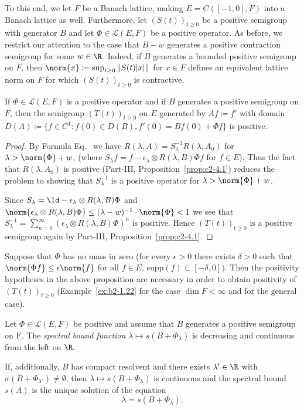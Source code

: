 To this end, we let $F$ be a Banach lattice, making $E = C([-1,0],F)$ into a Banach lattice as well. 
Furthermore, let $(S(t))_{t \geq 0}$ be a positive semigroup with generator $B$ and let $\Phi \in \mathcal{L}(E,F)$ be a positive operator. 
As before, we restrict our attention to the case that $B - w$ generates a positive contraction semigroup for some $w \in \R$. 
Indeed, if\/ $B$ generates a bounded positive semigroup on $F$, then $\norm{x}  \coloneq  \sup_{t \geq 0}\|S(t)|x|\|$ for $x \in F$ defines an equivalent lattice norm on $F$ for which $(S(t))_{t \geq 0}$ is contractive.
\begin{proposition}\label{prop:b4-3.5}
	If\/ $\Phi \in \mathcal{L}(E,F)$ is a positive operator and if\/ $B$ generates a positive semigroup on $F$, then the semigroup $(T(t))_{t \geq 0}$ on $E$ generated by $Af  \coloneq  f'$ with domain $D(A)  \coloneq  \{f \in C^1 \colon f(0) \in D(B), f'(0) = Bf(0) + \Phi f\}$ is positive.
\end{proposition}
\begin{proof} By Formula Eq.~ we have $R(\lambda,A) = S_\lambda^{-1}R(\lambda,A_{0})$ for $\lambda > \norm{\Phi}+w$, (where $S_\lambda f = f - \epsilon_\lambda \otimes R(\lambda,B)\Phi f$ for $f \in E$). 
Thus the fact that $R(\lambda,A_{0})$ is positive (Part-III, Proposition~\ref{prop:c2-4.1}) reduces the problem to showing that $S_\lambda^{-1}$ is a positive operator for $\lambda > \norm{\Phi}+w$.

Since $S_\lambda = \Id  - \epsilon_\lambda \otimes R(\lambda,B)\Phi$ and $\norm{\epsilon_\lambda \otimes R(\lambda,B)\Phi} \leq (\lambda-w)^{-1} \cdot \norm{\Phi} < 1$ we see that $S_\lambda^{-1} = \sum_{n=0}^{\infty}(\epsilon_\lambda \otimes R(\lambda,B)\Phi)^n$ is positive. 
Hence $(T(t))_{t \geq 0}$ is a positive semigroup again by Part-III, Proposition~\ref{prop:c2-4.1}.
\end{proof}
\begin{remark*}
Suppose that $\Phi$ has no mass in zero (\ie  for every $\epsilon > 0$ there exists $\delta > 0$ such that $\norm{\Phi f} \leq \epsilon \norm{f}$ for all $f \in E$, supp$(f) \subset [-\delta,0])$. 
Then the positivity hypotheses in the above proposition are necessary in order to obtain positivity of\/ $(T(t))_{t \geq 0}$ (\cf Example~\ref{ex:b2-1.22} for the case $\dim F < \infty$ and \textcite{kerscher:1986} for the general case).
\end{remark*}
\begin{proposition}\label{prop:b4-3.6}
	Let $\Phi \in \mathcal{L}(E,F)$ be positive and assume that $B$ generates a positive semigroup on F. 
    The \emph{spectral bound function} $\lambda \mapsto s(B + \Phi_\lambda)$ is decreasing and continuous from the left on $\R$.
	
	If, additionally, $B$ has compact resolvent and there exists $\lambda' \in \R$ with $\sigma(B + \Phi_{\lambda'}) \neq \emptyset$, then $\lambda \mapsto s(B + \Phi_\lambda)$ is continuous and the spectral bound $s(A)$ is the unique solution of the equation
	\begin{equation}\label{eq:b4-3.5}
		\lambda = s(B + \Phi_\lambda) .
	\end{equation}
\end{proposition}
